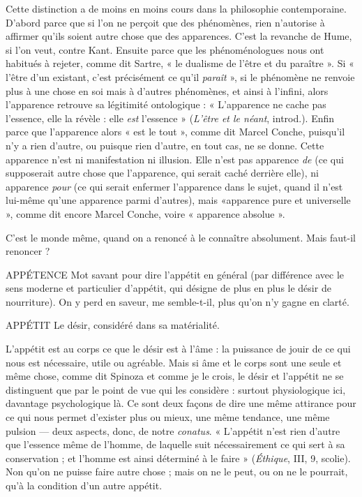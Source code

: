Cette distinction a de moins en moins cours dans la philosophie contemporaine.
D'abord parce que si l’on ne perçoit que des phénomènes, rien n’autorise
à affirmer qu’ils soient autre chose que des apparences. C’est la revanche de
Hume, si l’on veut, contre Kant. Ensuite parce que les phénoménologues nous
ont habitués à rejeter, comme dit Sartre, « le dualisme de l'être et du paraître ».
Si « l'être d’un existant, c’est précisément ce qu’il {\it paraît} », si le phénomène ne
renvoie plus à une chose en soi mais à d’autres phénomènes, et ainsi à l'infini,
alors l'apparence retrouve sa légitimité ontologique : « L’apparence ne cache
pas l'essence, elle la révèle : elle {\it est} l'essence » ({\it L'être et le néant}, introd.). Enfin
parce que l’apparence alors « est le tout », comme dit Marcel Conche, puisqu'il
n'y a rien d’autre, ou puisque rien d’autre, en tout cas, ne se donne. Cette
apparence n'est ni manifestation ni illusion. Elle n’est pas apparence {\it de} (ce qui
supposerait autre chose que l’apparence, qui serait caché derrière elle), ni apparence
{\it pour} (ce qui serait enfermer l'apparence dans le sujet, quand il n’est lui-même
qu'une apparence parmi d’autres), mais «apparence pure et
universelle », comme dit encore Marcel Conche, voire « apparence absolue ».

C’est le monde même, quand on a renoncé à le connaître absolument. Mais
faut-il renoncer ?

APPÉTENCE Mot savant pour dire l’appétit en général (par différence avec
le sens moderne et particulier d’appétit, qui désigne de plus
en plus le désir de nourriture). On y perd en saveur, me semble-t-il, plus qu’on
n’y gagne en clarté.

APPÉTIT Le désir, considéré dans sa matérialité.

L’appétit est au corps ce que le désir est à l’âme : la puissance de
jouir de ce qui nous est nécessaire, utile ou agréable. Mais si âme et le corps
sont une seule et même chose, comme dit Spinoza et comme je le crois, le désir
et l'appétit ne se distinguent que par le point de vue qui les considère : surtout
physiologique ici, davantage psychologique là. Ce sont deux façons de dire une
même attirance pour ce qui nous permet d’exister plus ou mieux, une même
tendance, une même pulsion — deux aspects, donc, de notre {\it conatus}. « L’appétit
n’est rien d’autre que l’essence même de l’homme, de laquelle suit nécessairement
ce qui sert à sa conservation ; et l’homme est ainsi déterminé à le faire »
({\it Éthique}, III, 9, scolie). Non qu’on ne puisse faire autre chose ; mais on ne le
peut, ou on ne le pourrait, qu’à la condition d’un autre appétit.

